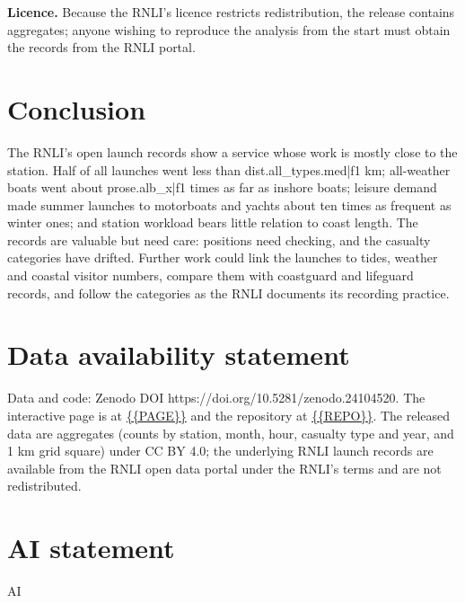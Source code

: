 \documentclass[11pt,a4paper]{article}
\begin{document}
\textbf{Licence.} Because the RNLI's licence restricts redistribution, the release contains aggregates; anyone wishing to reproduce the analysis from the start must obtain the records from the RNLI portal.

\section{Conclusion}\label{sec:conc}
The RNLI's open launch records show a service whose work is mostly close to the station. Half of all launches went less than {{dist.all_types.med|f1}} km; all-weather boats went about {{prose.alb_x|f1}} times as far as inshore boats; leisure demand made summer launches to motorboats and yachts about ten times as frequent as winter ones; and station workload bears little relation to coast length. The records are valuable but need care: positions need checking, and the casualty categories have drifted. Further work could link the launches to tides, weather and coastal visitor numbers, compare them with coastguard and lifeguard records, and follow the categories as the RNLI documents its recording practice.

\section*{Data availability statement}
Data and code: Zenodo DOI https://doi.org/10.5281/zenodo.24104520. The interactive page is at \url{{{PAGE}}} and the repository at \url{{{REPO}}}. The released data are aggregates (counts by station, month, hour, casualty type and year, and 1 km grid square) under CC BY 4.0; the underlying RNLI launch records are available from the RNLI open data portal under the RNLI's terms and are not redistributed.

\section*{AI statement}
{{AI}}
\end{document}

